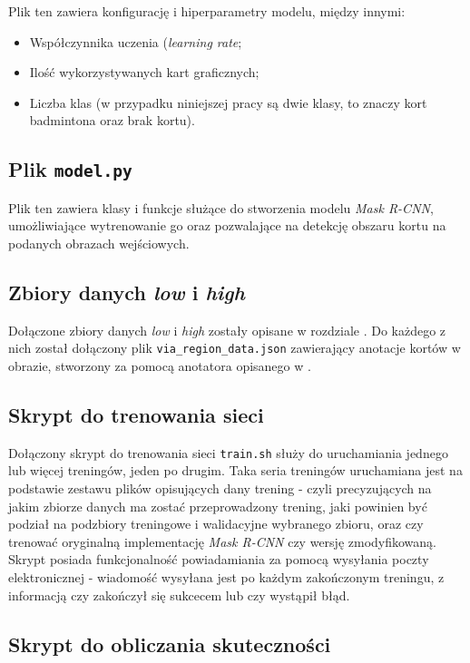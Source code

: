 Plik ten zawiera konfigurację i hiperparametry modelu, między innymi:
\begin{itemize}
  \item Współczynnika uczenia (\textit{learning rate};
  \item Ilość wykorzystywanych kart graficznych;
  \item Liczba klas (w przypadku niniejszej pracy są dwie klasy, to znaczy kort badmintona oraz brak kortu).
\end{itemize}

\subsection*{Plik \texttt{model.py}}

Plik ten zawiera klasy i funkcje służące do stworzenia modelu \textit{Mask R-CNN}, umożliwiające wytrenowanie go oraz pozwalające na detekcję obszaru kortu na podanych obrazach wejściowych.

\subsection*{Zbiory danych \textit{low} i \textit{high}}

Dołączone zbiory danych \textit{low} i \textit{high} zostały opisane w rozdziale .
Do każdego z nich został dołączony plik \texttt{via\_region\_data.json} zawierający anotacje kortów w obrazie, stworzony za pomocą anotatora opisanego w .

\subsection*{Skrypt do trenowania sieci}

Dołączony skrypt do trenowania sieci \texttt{train.sh} służy do uruchamiania jednego lub więcej treningów, jeden po drugim. Taka seria treningów uruchamiana jest na podstawie zestawu plików opisujących dany trening - czyli precyzujących na jakim zbiorze danych ma zostać przeprowadzony trening, jaki powinien być podział na podzbiory treningowe i walidacyjne wybranego zbioru, oraz czy trenować oryginalną implementację \textit{Mask R-CNN} czy wersję zmodyfikowaną. Skrypt posiada funkcjonalność powiadamiania za pomocą wysyłania poczty elektronicznej - wiadomość wysyłana jest po każdym zakończonym treningu, z informacją czy zakończył się sukcecem lub czy wystąpił błąd.

\subsection*{Skrypt do obliczania skuteczności}

